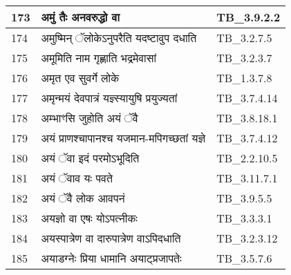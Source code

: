 \documentclass[17pt]{extarticle}
\begin{document}
\begin{longtable}{||p{0.4in}||p{4.9in}||p{0.9in}||}
    \hline
        
    173 & अमुं तैः अनवरुद्धो वा & TB\_3.9.2.2       \\
    
    \hline
        
    174 & अमुष्मिन् ॅलोकेऽनुपरैति यदष्टावुप दधाति & TB\_3.2.7.5       \\
    
    \hline
        
    175 & अमूमिति नाम गृह्णाति भद्रमेवासां & TB\_3.2.3.7       \\
    
    \hline
        
    176 & अमृत एव सुवर्गे लोके & TB\_1.3.7.8       \\
    
    \hline
        
    177 & अमृन्मयं देवपात्रं यज्ञ्स्यायुषि प्रयुज्यतां & TB\_3.7.4.14       \\
    
    \hline
        
    178 & अम्भाꣳसि जुहोति अयं ॅवै & TB\_3.8.18.1       \\
    
    \hline
        
    179 & अयं प्राणश्चापानश्च यजमान{-}मपिगच्छतां यज्ञे & TB\_3.7.4.12       \\
    
    \hline
        
    180 & अयं ॅवा इदं परमोऽभूदिति & TB\_2.2.10.5       \\
    
    \hline
        
    181 & अयं ॅवाव यः पवते & TB\_3.11.7.1       \\
    
    \hline
        
    182 & अयं ॅवै लोक आवपनं & TB\_3.9.5.5       \\
    
    \hline
        
    183 & अयज्ञो वा एषः योऽपत्नीकः & TB\_3.3.3.1       \\
    
    \hline
        
    184 & अयस्पात्रेण वा दारुपात्रेण वाऽपिदधाति & TB\_3.2.3.12       \\
    
    \hline
        
    185 & अयाडग्नेः प्रिया धामानि अयाट्प्रजापतेः & TB\_3.5.7.6       \\
    

\end{longtable}
\end{document}
